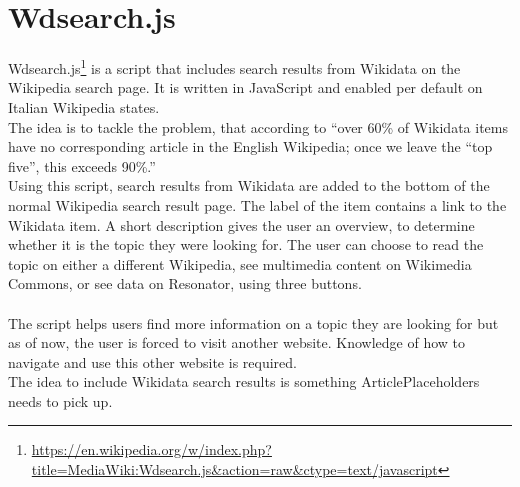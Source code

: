 \section{Wdsearch.js}
Wdsearch.js\footnote{\url{https://en.wikipedia.org/w/index.php?title=MediaWiki:Wdsearch.js&action=raw&ctype=text/javascript}} is a script that includes search results from Wikidata on the Wikipedia search page. It is written in JavaScript and enabled per default on Italian Wikipedia \citet{gerardm:01} states. \\
The idea is to tackle the problem, that according to \citet{manske:01} ``over 60\% of Wikidata items have no corresponding article in the English Wikipedia; once we leave the ``top five'', this exceeds 90\%.'' \\
Using this script, search results from Wikidata are added to the bottom of the normal Wikipedia search result page. The label of the item contains a link to the Wikidata item. A short description gives the user an overview, to determine whether it is the topic they were looking for. The user can choose to read the topic on either a different Wikipedia, see multimedia content on Wikimedia Commons, or see data on Resonator, using three buttons. \\
\\
The script helps users find more information on a topic they are looking for but as of now, the user is forced to visit another website. Knowledge of how to navigate and use this other website is required. \\
The idea to include Wikidata search results is something ArticlePlaceholders needs to pick up.